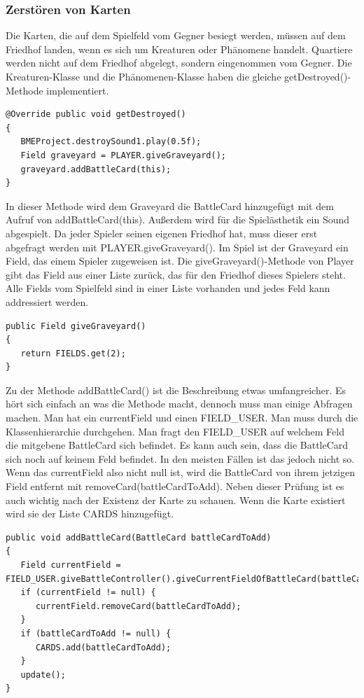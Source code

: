 \subsubsection{Zerstören von Karten}
Die Karten, die auf dem Spielfeld vom Gegner besiegt werden, müssen auf dem Friedhof landen, wenn es sich um Kreaturen oder Phänomene handelt. Quartiere werden nicht auf dem Friedhof abgelegt, sondern eingenommen vom Gegner. Die Kreaturen-Klasse und die Phänomenen-Klasse haben die gleiche getDestroyed()-Methode implementiert.

\begin{lstlisting}
@Override public void getDestroyed()
{
   BMEProject.destroySound1.play(0.5f);
   Field graveyard = PLAYER.giveGraveyard();
   graveyard.addBattleCard(this);
}
\end{lstlisting}

In dieser Methode wird dem Graveyard die BattleCard hinzugefügt mit dem Aufruf von addBattleCard(this). Außerdem wird für die Spielästhetik ein Sound abgespielt.
Da jeder Spieler seinen eigenen Friedhof hat, muss dieser erst abgefragt werden mit PLAYER.giveGraveyard(). Im Spiel ist der Graveyard ein Field, das einem Spieler zugeweisen ist. Die giveGraveyard()-Methode von Player gibt das Field aus einer Liste zurück, das für den Friedhof dieses Spielers steht. Alle Fields vom Spielfeld sind in einer Liste vorhanden und jedes Feld kann addressiert werden.

\begin{lstlisting}
public Field giveGraveyard()
{
   return FIELDS.get(2);
}
\end{lstlisting}

Zu der Methode addBattleCard() ist die Beschreibung etwas umfangreicher. Es hört sich einfach an was die Methode macht, dennoch muss man einige Abfragen machen.
Man hat ein currentField und einen FIELD\_USER. Man muss durch die Klassenhierarchie durchgehen. Man fragt den FIELD\_USER auf welchem Feld die mitgebene BattleCard sich befindet. Es kann auch sein, dass die BattleCard sich noch auf keinem Feld befindet. In den meisten Fällen ist das jedoch nicht so. Wenn das currentField also nicht null ist, wird die BattleCard von ihrem jetzigen Field entfernt mit removeCard(battleCardToAdd). Neben dieser Prüfung ist es auch wichtig nach der Existenz der Karte zu schauen. Wenn die Karte existiert wird sie der Liste CARDS hinzugefügt.

\begin{lstlisting}
public void addBattleCard(BattleCard battleCardToAdd)
{
   Field currentField = FIELD_USER.giveBattleController().giveCurrentFieldOfBattleCard(battleCardToAdd);
   if (currentField != null) {
      currentField.removeCard(battleCardToAdd);
   }
   if (battleCardToAdd != null) {
      CARDS.add(battleCardToAdd);
   }
   update();
}
\end{lstlisting}

